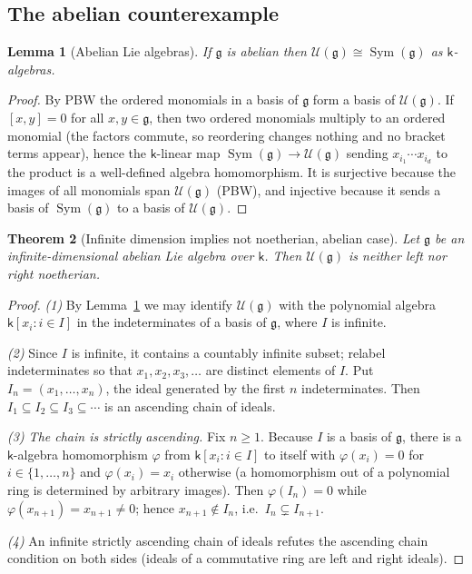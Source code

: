 \documentclass[11pt]{ctexart}
\theoremstyle{plain}
\newtheorem{theorem}{Theorem}[section]
\newtheorem{lemma}[theorem]{Lemma}
\theoremstyle{definition}
\theoremstyle{remark}
\newcommand{\kk}{\mathsf{k}}
\newcommand{\gl}{\mathfrak{g}}
\newcommand{\UU}{\mathcal{U}}
\newcommand{\Sym}{\operatorname{Sym}}
\begin{document}
\subsection{The abelian counterexample}

\begin{lemma}[Abelian Lie algebras]\label{lem:abelian}
If $\gl$ is abelian then $\UU(\gl)\cong\Sym(\gl)$ as $\kk$-algebras.
\end{lemma}

\begin{proof}
By PBW the ordered monomials in a basis of $\gl$ form a basis of $\UU(\gl)$. If
$[x,y]=0$ for all $x,y\in\gl$, then two ordered monomials multiply to an ordered
monomial (the factors commute, so reordering changes nothing and no bracket terms
appear), hence the $\kk$-linear map $\Sym(\gl)\to\UU(\gl)$ sending
$x_{i_1}\cdots x_{i_d}$ to the product is a well-defined algebra homomorphism. It is
surjective because the images of all monomials span $\UU(\gl)$ (PBW), and injective
because it sends a basis of $\Sym(\gl)$ to a basis of $\UU(\gl)$.
\end{proof}

\begin{theorem}[Infinite dimension implies not noetherian, abelian case]\label{thm:abelian}
Let $\gl$ be an infinite-dimensional abelian Lie algebra over $\kk$. Then
$\UU(\gl)$ is neither left nor right noetherian.
\end{theorem}

\begin{proof}
\emph{(1)} By Lemma~\ref{lem:abelian} we may identify $\UU(\gl)$ with the polynomial
algebra $\kk[x_i:i\in I]$ in the indeterminates of a basis of $\gl$, where $I$ is
infinite.

\emph{(2)} Since $I$ is infinite, it contains a countably infinite subset; relabel
indeterminates so that $x_1,x_2,x_3,\dots$ are distinct elements of $I$. Put
$I_n=(x_1,\dots,x_n)$, the ideal generated by the first $n$ indeterminates. Then
$I_1\subseteq I_2\subseteq I_3\subseteq\cdots$ is an ascending chain of ideals.

\emph{(3) The chain is strictly ascending.} Fix $n\ge1$. Because $I$ is a basis of
$\gl$, there is a $\kk$-algebra homomorphism $\varphi$ from
$\kk[x_i:i\in I]$ to itself with $\varphi(x_i)=0$ for $i\in\{1,\dots,n\}$ and
$\varphi(x_i)=x_i$ otherwise (a homomorphism out of a polynomial ring is determined
by arbitrary images). Then $\varphi(I_n)=0$ while $\varphi(x_{n+1})=x_{n+1}\neq0$;
hence $x_{n+1}\notin I_n$, i.e.\ $I_n\subsetneq I_{n+1}$.

\emph{(4)} An infinite strictly ascending chain of ideals refutes the ascending chain
condition on both sides (ideals of a commutative ring are left and right ideals).
\end{proof}
\end{document}

